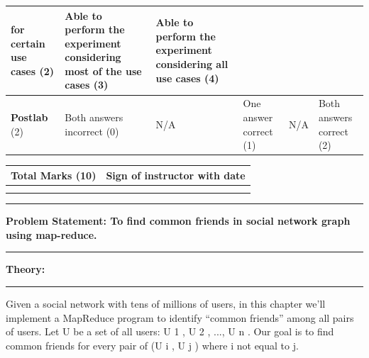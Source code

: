 \documentclass[11pt,article]{memoir}
\begin{document}
\begin{flushleft}
\begin{tabular}{|p{2cm}|p{2cm}|p{2cm}|p{2cm}|p{2cm}|p{2cm}|}
                              for certain use
                              cases (2) & Able to
                              perform the
                              experiment
                              considering
                              most of the
                              use cases (3)
                              & Able to
                              perform the
                              experiment
                              considering
                              all use cases
                              (4) \\ 
                             \hline \textbf{Postlab} (2) & Both answers incorrect (0) & N/A & One answer correct  (1) & N/A & Both answers correct (2) \\ 
                             \hline 
                             \end{tabular}
        \begin{table}[h!]
        \centering
        \begin{tabular}{|c|c|}
                \hline \textbf{Total Marks (10)} & \textbf{Sign of instructor with date} \\ 
                \hline  &  \\ & \\
                \hline 
                \end{tabular} 
        \end{table}
        
    \pagebreak


\maketitle

\hrule \vspace{0.2cm}
\textbf{Problem Statement: To find common friends in social network graph using map-reduce. }\hrule\vspace{0.2cm}
\textbf{Theory:}\hrule\vspace{0.2cm}
\parskip 2mm
Given a social network with tens of millions of users, in this chapter we’ll implement
a MapReduce program to identify “common friends” among all pairs of users. Let U
be a set of all users: {U 1 , U 2 , ..., U n }. Our goal is to find common friends for every pair
of (U i , U j ) where i not equal to j.


\end{flushleft}
\end{document}

